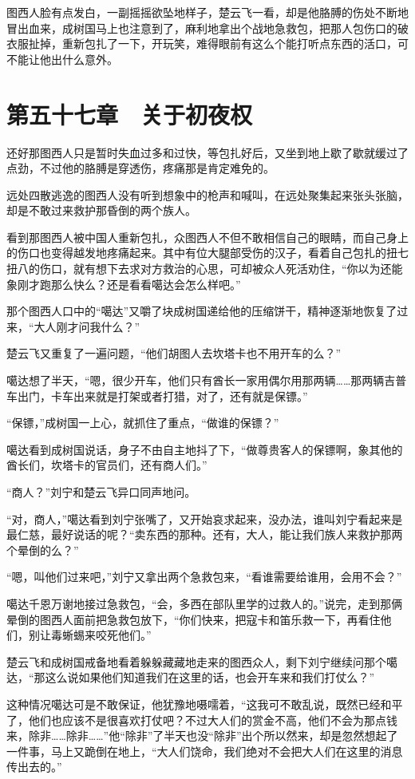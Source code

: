 图西人脸有点发白，一副摇摇欲坠地样子，楚云飞一看，却是他胳膊的伤处不断地冒出血来，成树国马上也注意到了，麻利地拿出个战地急救包，把那人包伤口的破衣服扯掉，重新包扎了一下，开玩笑，难得眼前有这么个能打听点东西的活口，可不能让他出什么意外。

\section{第五十七章　关于初夜权}

还好那图西人只是暂时失血过多和过快，等包扎好后，又坐到地上歇了歇就缓过了点劲，不过他的胳膊是穿透伤，疼痛那是肯定难免的。

远处四散逃逸的图西人没有听到想象中的枪声和喊叫，在远处聚集起来张头张脑，却是不敢过来救护那昏倒的两个族人。

看到那图西人被中国人重新包扎，众图西人不但不敢相信自己的眼睛，而自己身上的伤口也变得越发地疼痛起来。其中有位大腿部受伤的汉子，看着自己包扎的扭七扭八的伤口，就有想下去求对方救治的心思，可却被众人死活劝住，“你以为还能象刚才跑那么快么？还是看看噶达会怎么样吧。”

那个图西人口中的“噶达”又嚼了块成树国递给他的压缩饼干，精神逐渐地恢复了过来，“大人刚才问我什么？”

楚云飞又重复了一遍问题，“他们胡图人去坎塔卡也不用开车的么？”

噶达想了半天，“嗯，很少开车，他们只有酋长一家用偶尔用那两辆……那两辆吉普车出门，卡车出来就是打架或者打猎，对了，还有就是保镖。”

“保镖，”成树国一上心，就抓住了重点，“做谁的保镖？”

噶达看到成树国说话，身子不由自主地抖了下，“做尊贵客人的保镖啊，象其他的酋长们，坎塔卡的官员们，还有商人们。”

“商人？”刘宁和楚云飞异口同声地问。

“对，商人，”噶达看到刘宁张嘴了，又开始哀求起来，没办法，谁叫刘宁看起来是最仁慈，最好说话的呢？“卖东西的那种。还有，大人，能让我们族人来救护那两个晕倒的么？”

“嗯，叫他们过来吧，”刘宁又拿出两个急救包来，“看谁需要给谁用，会用不会？”

噶达千恩万谢地接过急救包，“会，多西在部队里学的过救人的。”说完，走到那俩晕倒的图西人面前把急救包放下，“你们快来，把寇卡和笛乐救一下，再看住他们，别让毒蜥蜴来咬死他们。”

楚云飞和成树国戒备地看着躲躲藏藏地走来的图西众人，剩下刘宁继续问那个噶达，“那这么说如果他们知道我们在这里的话，也会开车来和我们打仗么？”

这种情况噶达可是不敢保证，他犹豫地嗫嚅着，“这我可不敢乱说，既然已经和平了，他们也应该不是很喜欢打仗吧？不过大人们的赏金不高，他们不会为那点钱来，除非……除非……”他“除非”了半天也没“除非”出个所以然来，却是忽然想起了一件事，马上又跪倒在地上，“大人们饶命，我们绝对不会把大人们在这里的消息传出去的。”

